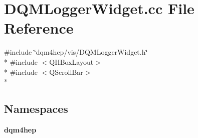\section{D\+Q\+M\+Logger\+Widget.\+cc File Reference}
\label{DQMLoggerWidget_8cc}
{\ttfamily \#include \char`\"{}dqm4hep/vis/\+D\+Q\+M\+Logger\+Widget.\+h\char`\"{}}\\*
{\ttfamily \#include $<$Q\+H\+Box\+Layout$>$}\\*
{\ttfamily \#include $<$Q\+Scroll\+Bar$>$}\\*
\subsection*{Namespaces}
\begin{DoxyCompactItemize}
\item 
 {\bf dqm4hep}
\end{DoxyCompactItemize}
